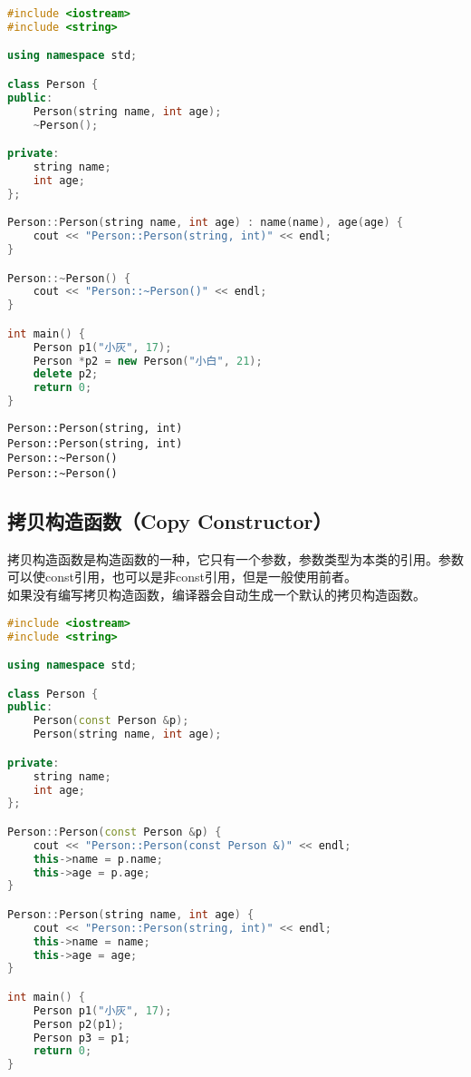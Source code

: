 \begin{lstlisting}[language=C++]
#include <iostream>
#include <string>

using namespace std;

class Person {
public:
    Person(string name, int age);
    ~Person();

private:
    string name;
    int age;
};

Person::Person(string name, int age) : name(name), age(age) {
    cout << "Person::Person(string, int)" << endl;
}

Person::~Person() {
    cout << "Person::~Person()" << endl;
}

int main() {
    Person p1("小灰", 17);
    Person *p2 = new Person("小白", 21);
    delete p2;
    return 0;
}
\end{lstlisting}

\begin{tcolorbox}
	\begin{verbatim}
Person::Person(string, int)
Person::Person(string, int)
Person::~Person()
Person::~Person()
	\end{verbatim}
\end{tcolorbox}

\vspace{0.5cm}

\subsection{拷贝构造函数（Copy Constructor）}

拷贝构造函数是构造函数的一种，它只有一个参数，参数类型为本类的引用。参数可以使const引用，也可以是非const引用，但是一般使用前者。\\

如果没有编写拷贝构造函数，编译器会自动生成一个默认的拷贝构造函数。\\


\begin{lstlisting}[language=C++]
#include <iostream>
#include <string>

using namespace std;

class Person {
public:
    Person(const Person &p);
    Person(string name, int age);

private:
    string name;
    int age;
};

Person::Person(const Person &p) {
    cout << "Person::Person(const Person &)" << endl;
    this->name = p.name;
    this->age = p.age;
}

Person::Person(string name, int age) {
    cout << "Person::Person(string, int)" << endl;
    this->name = name;
    this->age = age;
}

int main() {
    Person p1("小灰", 17);
    Person p2(p1);
    Person p3 = p1;
    return 0;
}
\end{lstlisting}

